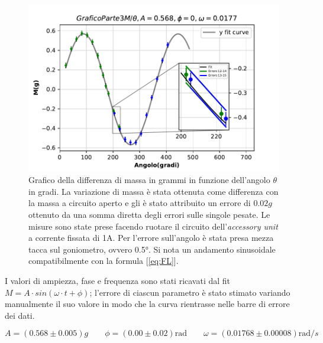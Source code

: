 {\fontsize{12}{14}\selectfont 

\begin{figure}[H]
  \centering
  \includegraphics[width=15cm]{Figures/GraficoMthetaParte3.pdf}
  \caption{Grafico della differenza di massa in grammi in funzione dell'angolo $\theta$ in gradi. La variazione di massa è stata ottenuta come differenza con la massa a circuito aperto e gli è stato attribuito un errore di $0.02g$ ottenuto da una somma diretta degli errori sulle singole pesate. Le misure sono state prese facendo ruotare il circuito dell'\emph{accessory unit} a corrente fissata di 1A. Per l'errore sull'angolo è stata presa mezza tacca sul goniometro, ovvero 0.5°.
  Si nota un andamento sinusoidale compatibilmente con la formula [\ref{eq:FL}].}   
  \label{fig:GraficoParteIII}
\end{figure}
I valori di ampiezza, fase e frequenza sono stati ricavati dal fit $M = A \cdot sin(\omega \cdot t + \phi)$; l'errore di ciascun parametro è stato stimato variando manualmente il suo valore in modo che la curva rientrasse nelle barre di errore dei dati.

\begin{equation*}
    A = (0.568 \pm 0.005) g \qquad \phi = (0.00 \pm 0.02) \text{rad} \qquad \omega = (0.01768 \pm 0.00008)\text{rad}/s %
\end{equation*}

\par}
